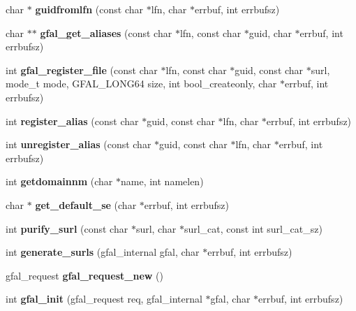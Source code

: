 \begin{CompactItemize}
\item 
char $\ast$ \textbf{guidfromlfn} (const char $\ast$lfn, char $\ast$errbuf, int errbufsz)\label{gfal__common_8c_fffd314fbaeab0aff9beb7c5b47ab13d}

\item 
char $\ast$$\ast$ \textbf{gfal\_\-get\_\-aliases} (const char $\ast$lfn, const char $\ast$guid, char $\ast$errbuf, int errbufsz)\label{group__internal__group_g25d4ae6bef6570590efbc8548e7d79e2}

\item 
int \textbf{gfal\_\-register\_\-file} (const char $\ast$lfn, const char $\ast$guid, const char $\ast$surl, mode\_\-t mode, GFAL\_\-LONG64 size, int bool\_\-createonly, char $\ast$errbuf, int errbufsz)\label{group__internal__group_gdb09f20d086253b45c5d2896be95b4a9}

\item 
int \textbf{register\_\-alias} (const char $\ast$guid, const char $\ast$lfn, char $\ast$errbuf, int errbufsz)\label{gfal__common_8c_4bb13064562b552627698601dda010cd}

\item 
int \textbf{unregister\_\-alias} (const char $\ast$guid, const char $\ast$lfn, char $\ast$errbuf, int errbufsz)\label{gfal__common_8c_8877542e026eef3292c7f5ab44c55124}

\item 
int \textbf{getdomainnm} (char $\ast$name, int namelen)\label{gfal__common_8c_446a829e4f333d3a0364ab0f2b5a2dc7}

\item 
char $\ast$ \textbf{get\_\-default\_\-se} (char $\ast$errbuf, int errbufsz)\label{gfal__common_8c_806f5f7bc913922610d15e88a78b7294}

\item 
int \textbf{purify\_\-surl} (const char $\ast$surl, char $\ast$surl\_\-cat, const int surl\_\-cat\_\-sz)\label{gfal__common_8c_b082f9f86bdeee9d7d01f1e2cf9c7c58}

\item 
int \textbf{generate\_\-surls} (gfal\_\-internal gfal, char $\ast$errbuf, int errbufsz)\label{gfal__common_8c_e63263d48c0304e99084f6399c22c6f2}

\item 
gfal\_\-request \textbf{gfal\_\-request\_\-new} ()\label{gfal__common_8c_b5d503849656335232e56583b376ee22}

\item 
int \textbf{gfal\_\-init} (gfal\_\-request req, gfal\_\-internal $\ast$gfal, char $\ast$errbuf, int errbufsz)\label{gfal__common_8c_2f7ff4951ca00ee9acb7a3bd3c86681d}


\end{CompactItemize}
